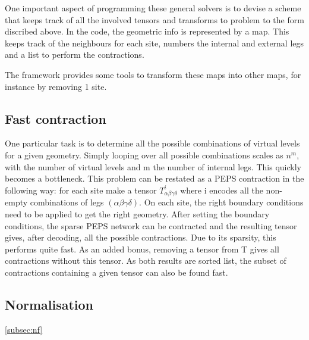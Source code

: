 One important aspect of programming these general solvers is to devise a scheme that keeps track of all the involved tensors and transforms to problem to the form discribed above. In the code, the geometric info is represented by a map. This keeps track of the neighbours for each site, numbers the internal and external legs and a list to perform the contractions.

The framework provides some tools to transform these maps into other maps, for instance by removing 1 site.

\subsection{Fast contraction}

One particular task is to determine all the possible combinations of virtual levels for a given geometry. Simply looping over all possible combinations scales as $n^m$, with the number of virtual levels and m the number of internal legs. This quickly becomes a bottleneck.
This problem can be restated as a PEPS contraction in the following way: for each site make a tensor $ T^{i}_{  \alpha \beta \gamma \delta } $ where i encodes all the non-empty combinations of legs $(\alpha \beta \gamma \delta)$. On each site, the right boundary conditions need to be applied to get the right geometry. After setting the boundary conditions, the sparse PEPS network can be contracted and the resulting tensor gives, after decoding, all the possible contractions. Due to its sparsity, this performs quite fast.
As an added bonus, removing a tensor from T gives all contractions without this tensor. As both results are sorted list, the subset of contractions containing a given tensor can also be found fast.

\subsection{Normalisation}\cref{subsec:nf}

